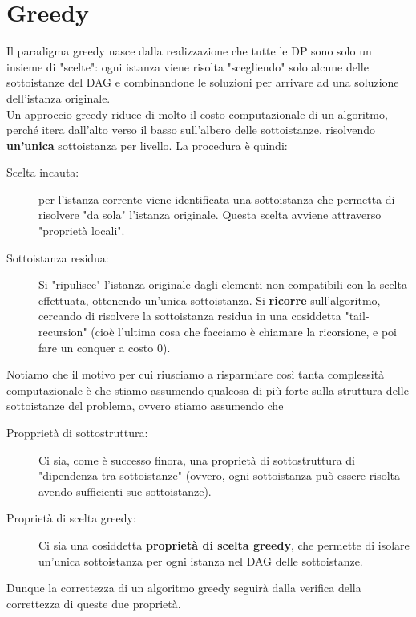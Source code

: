 \documentclass[11pt]{scrartcl}
\begin{document}
	\newpage
	
	\section{Greedy}
	Il paradigma greedy nasce dalla realizzazione che tutte le DP sono solo un insieme di "scelte": ogni istanza viene risolta "scegliendo" solo alcune delle sottoistanze del DAG e combinandone le soluzioni per arrivare ad una soluzione dell'istanza originale. \\
	Un approccio greedy riduce di molto il costo computazionale di un algoritmo, perché itera dall'alto verso il basso sull'albero delle sottoistanze, risolvendo \textbf{un'unica} sottoistanza per livello. La procedura è quindi:
	\begin{description}
		\item[Scelta incauta:] per l'istanza corrente viene identificata una sottoistanza che permetta di risolvere "da sola" l'istanza originale. Questa scelta avviene attraverso "proprietà locali".
		\item[Sottoistanza residua:] Si "ripulisce" l'istanza originale dagli elementi non compatibili con la scelta effettuata, ottenendo un'unica sottoistanza. Si \textbf{ricorre} sull'algoritmo, cercando di risolvere la sottoistanza residua in una cosiddetta "tail-recursion" (cioè l'ultima cosa che facciamo è chiamare la ricorsione, e poi fare un conquer a costo $0$).
	\end{description}
	Notiamo che il motivo per cui riusciamo a risparmiare così tanta complessità computazionale è che stiamo assumendo qualcosa di più forte sulla struttura delle sottoistanze del problema, ovvero stiamo assumendo che 
	\begin{description}
		\item[Propprietà di sottostruttura:] Ci sia, come è successo finora, una proprietà di sottostruttura di "dipendenza tra sottoistanze" (ovvero, ogni sottoistanza può essere risolta avendo sufficienti sue sottoistanze).
		\item[Proprietà di scelta greedy:] Ci sia una cosiddetta \textbf{proprietà di scelta greedy}, che permette di isolare un'unica sottoistanza per ogni istanza nel DAG delle sottoistanze.
	\end{description}
	Dunque la correttezza di un algoritmo greedy seguirà dalla verifica della correttezza di queste due proprietà.
\end{document}
